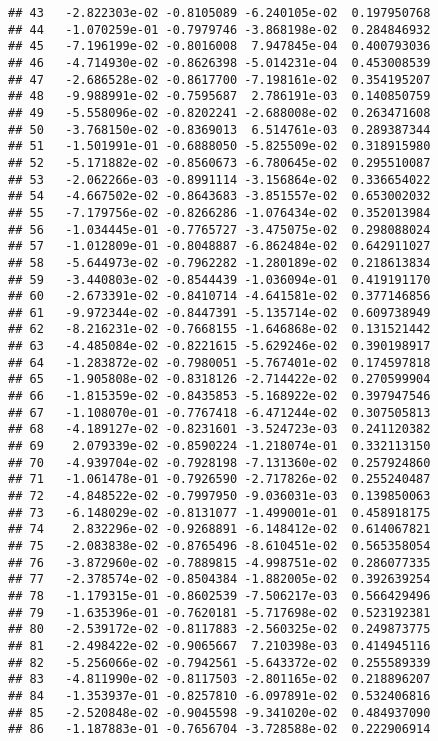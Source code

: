 \documentclass[
]{article}
\begin{document}
\begin{verbatim}
## 43   -2.822303e-02 -0.8105089 -6.240105e-02  0.197950768
## 44   -1.070259e-01 -0.7979746 -3.868198e-02  0.284846932
## 45   -7.196199e-02 -0.8016008  7.947845e-04  0.400793036
## 46   -4.714930e-02 -0.8626398 -5.014231e-04  0.453008539
## 47   -2.686528e-02 -0.8617700 -7.198161e-02  0.354195207
## 48   -9.988991e-02 -0.7595687  2.786191e-03  0.140850759
## 49   -5.558096e-02 -0.8202241 -2.688008e-02  0.263471608
## 50   -3.768150e-02 -0.8369013  6.514761e-03  0.289387344
## 51   -1.501991e-01 -0.6888050 -5.825509e-02  0.318915980
## 52   -5.171882e-02 -0.8560673 -6.780645e-02  0.295510087
## 53   -2.062266e-03 -0.8991114 -3.156864e-02  0.336654022
## 54   -4.667502e-02 -0.8643683 -3.851557e-02  0.653002032
## 55   -7.179756e-02 -0.8266286 -1.076434e-02  0.352013984
## 56   -1.034445e-01 -0.7765727 -3.475075e-02  0.298088024
## 57   -1.012809e-01 -0.8048887 -6.862484e-02  0.642911027
## 58   -5.644973e-02 -0.7962282 -1.280189e-02  0.218613834
## 59   -3.440803e-02 -0.8544439 -1.036094e-01  0.419191170
## 60   -2.673391e-02 -0.8410714 -4.641581e-02  0.377146856
## 61   -9.972344e-02 -0.8447391 -5.135714e-02  0.609738949
## 62   -8.216231e-02 -0.7668155 -1.646868e-02  0.131521442
## 63   -4.485084e-02 -0.8221615 -5.629246e-02  0.390198917
## 64   -1.283872e-02 -0.7980051 -5.767401e-02  0.174597818
## 65   -1.905808e-02 -0.8318126 -2.714422e-02  0.270599904
## 66   -1.815359e-02 -0.8435853 -5.168922e-02  0.397947546
## 67   -1.108070e-01 -0.7767418 -6.471244e-02  0.307505813
## 68   -4.189127e-02 -0.8231601 -3.524723e-03  0.241120382
## 69    2.079339e-02 -0.8590224 -1.218074e-01  0.332113150
## 70   -4.939704e-02 -0.7928198 -7.131360e-02  0.257924860
## 71   -1.061478e-01 -0.7926590 -2.717826e-02  0.255240487
## 72   -4.848522e-02 -0.7997950 -9.036031e-03  0.139850063
## 73   -6.148029e-02 -0.8131077 -1.499001e-01  0.458918175
## 74    2.832296e-02 -0.9268891 -6.148412e-02  0.614067821
## 75   -2.083838e-02 -0.8765496 -8.610451e-02  0.565358054
## 76   -3.872960e-02 -0.7889815 -4.998751e-02  0.286077335
## 77   -2.378574e-02 -0.8504384 -1.882005e-02  0.392639254
## 78   -1.179315e-01 -0.8602539 -7.506217e-03  0.566429496
## 79   -1.635396e-01 -0.7620181 -5.717698e-02  0.523192381
## 80   -2.539172e-02 -0.8117883 -2.560325e-02  0.249873775
## 81   -2.498422e-02 -0.9065667  7.210398e-03  0.414945116
## 82   -5.256066e-02 -0.7942561 -5.643372e-02  0.255589339
## 83   -4.811990e-02 -0.8117503 -2.801165e-02  0.218896207
## 84   -1.353937e-01 -0.8257810 -6.097891e-02  0.532406816
## 85   -2.520848e-02 -0.9045598 -9.341020e-02  0.484937090
## 86   -1.187883e-01 -0.7656704 -3.728588e-02  0.222906914

\end{verbatim}
\end{document}
